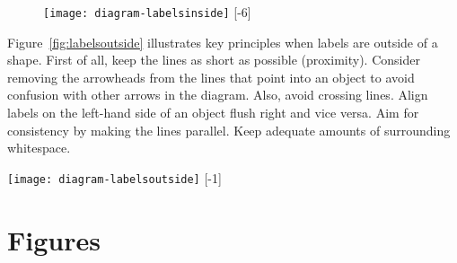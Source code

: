 \begin{figure}[t]
\centering
\texttt{[image: diagram-labelsinside]}
[-6\baselineskip]
\end{figure}

Figure~\ref{fig:labelsoutside} illustrates key principles when labels are outside of a shape. First of all, keep the lines as short as possible (proximity). Consider removing the arrowheads from the lines that point into an object to avoid confusion with other arrows in the diagram. Also, avoid crossing lines. Align labels on the left-hand side of an object flush right and vice versa. Aim for consistency by making the lines parallel. Keep adequate amounts of surrounding whitespace.

\begin{marginfigure}
\centering
\texttt{[image: diagram-labelsoutside]}
[-1\baselineskip]
\end{marginfigure}

\section{Figures}

















